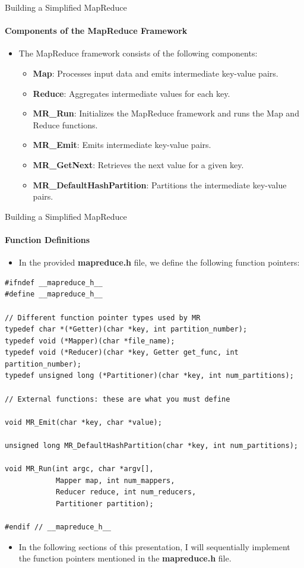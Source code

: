 \documentclass[10pt]{beamer}
\begin{document}
\begin{frame}{Building a Simplified MapReduce}
    \framesubtitle{Components of the MapReduce Framework}
    \begin{itemize}
        \item The MapReduce framework consists of the following components:
              \begin{itemize}
                  \item \textbf{Map}: Processes input data and emits intermediate key-value pairs.
                  \item \textbf{Reduce}: Aggregates intermediate values for each key.
                  \item \textbf{MR\_Run}: Initializes the MapReduce framework and runs the Map and Reduce functions.
                  \item \textbf{MR\_Emit}: Emits intermediate key-value pairs.
                  \item \textbf{MR\_GetNext}: Retrieves the next value for a given key.
                  \item \textbf{MR\_DefaultHashPartition}: Partitions the intermediate key-value pairs.
              \end{itemize}
    \end{itemize}
\end{frame}

\begin{frame}[fragile]{Building a Simplified MapReduce}
    \framesubtitle{Function Definitions}
    \begin{itemize}
        \item In the provided \textbf{mapreduce.h} file, we define the following function pointers:
    \end{itemize}
    \begin{lstlisting}
#ifndef __mapreduce_h__
#define __mapreduce_h__

// Different function pointer types used by MR
typedef char *(*Getter)(char *key, int partition_number);
typedef void (*Mapper)(char *file_name);
typedef void (*Reducer)(char *key, Getter get_func, int partition_number);
typedef unsigned long (*Partitioner)(char *key, int num_partitions);

// External functions: these are what you must define

void MR_Emit(char *key, char *value);

unsigned long MR_DefaultHashPartition(char *key, int num_partitions);

void MR_Run(int argc, char *argv[],
            Mapper map, int num_mappers,
            Reducer reduce, int num_reducers,
            Partitioner partition);

#endif // __mapreduce_h__
              \end{lstlisting}
    \begin{itemize}
        \item In the following sections of this presentation, I will sequentially implement the function pointers mentioned in the \textbf{mapreduce.h} file.
    \end{itemize}
\end{frame}
\end{document}
